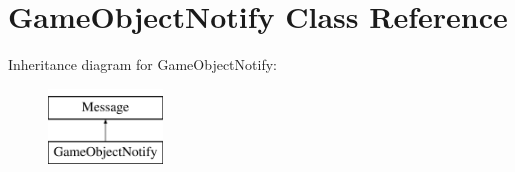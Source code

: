 \hypertarget{class_game_object_notify}{\section{Game\-Object\-Notify Class Reference}
\label{class_game_object_notify}
}
Inheritance diagram for Game\-Object\-Notify\-:\begin{figure}[H]
\begin{center}
\leavevmode
\includegraphics[height=2.000000cm]{class_game_object_notify}
\end{center}
\end{figure}
